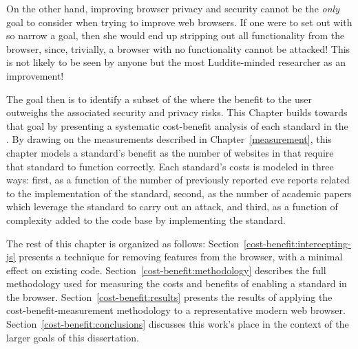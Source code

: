 On the other hand, improving browser privacy and security cannot be the
\textit{only} goal to consider when trying to improve web browsers.  If one
were to set out with so narrow a goal, then she would end up stripping out all
functionality from the browser, since, trivially, a browser with no
functionality cannot be attacked!  This is not likely to be seen by anyone but
the most Luddite-minded researcher as an improvement!

The goal then is to identify a subset of the \WAPI where the benefit to the
user outweighs the associated security and privacy risks.  This Chapter builds
towards that goal by presenting a systematic cost-benefit analysis of each
standard in the \WAPI.  By drawing on the measurements described in
Chapter~\ref{measurement}, this chapter models a standard's benefit as the
number of websites in \ATK that require that standard to function
correctly.  Each standard's costs is modeled in three ways: first, as a
function of the number of previously reported \gls{cve} reports related to the
implementation of the standard, second, as the number of academic papers which
leverage the standard to carry out an attack, and third, as a function of
complexity added to the code base by implementing the standard.

The rest of this chapter is organized as follows:
Section~\ref{cost-benefit:intercepting-js} presents a technique for removing
\WAPI features from the browser, with a minimal effect on existing code.
Section~\ref{cost-benefit:methodology} describes the full methodology used for
measuring the costs and benefits of enabling a \WAPI standard in the browser.
Section~\ref{cost-benefit:results} presents the results of applying the
cost-benefit-measurement methodology to a representative modern web browser.
Section~\ref{cost-benefit:conclusions} discusses this work's place in the
context of the larger goals of this dissertation.
